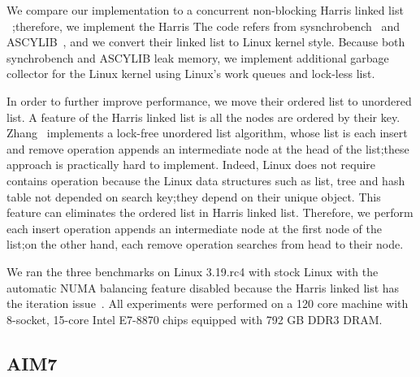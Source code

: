 
We compare our  implementation to a concurrent non-blocking Harris
linked list ~\cite{Harris2001Lockfree};therefore, we implement the Harris
The code refers from sysnchrobench~\cite{Gramoli2015Synchrobench} and
ASCYLIB~\cite{David2015ASYNCHRONIZED}, and we convert their linked list to
Linux kernel style.
Because both synchrobench and ASCYLIB leak memory, we implement additional
garbage collector for the Linux kernel using Linux's work queues and lock-less
list.

In order to further improve performance, we move their ordered list to
unordered list. 
A feature of the Harris linked list is all the nodes are ordered by
their key. 
Zhang~\cite{zhang2013practical} implements a lock-free unordered list
algorithm, whose list is each insert and remove operation appends an
intermediate node at the head of the list;these approach is practically
hard to implement.
Indeed, Linux does not require contains operation because the Linux data
structures such as list, tree and hash table not depended on search key;they
depend on their unique object.
This feature can eliminates the ordered list in Harris linked list.
Therefore, we perform each insert operation appends an intermediate node at
the first node of the list;on the other hand, each remove operation searches
from head to their node.


We ran the three benchmarks on Linux 3.19.rc4 with stock Linux with 
the automatic NUMA balancing feature disabled because the
Harris linked list has the iteration issue~\cite{petrank2013lock}. 
All experiments were performed on a 120 core machine with 8-socket, 15-core
Intel E7-8870 chips equipped with 792 GB DDR3 DRAM.


\subsection{AIM7}

